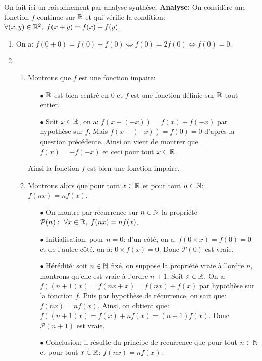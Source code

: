 \documentclass[a4paper, 11pt,reqno]{article}
\begin{document}
\begin{correction}  \; On fait ici un raisonnement par analyse-synth\`{e}se. \textbf{Analyse:} On consid\`{e}re une fonction $f$ continue sur $\mathbb{R}$ et qui v\'erifie la condition: $\forall (x,y)\in\R^2,\ f(x+y)=f(x)+f(y)$.
	\begin{enumerate}
		\item On a: $f(0+0)=f(0)+f(0)\Leftrightarrow f(0)=2f(0)\Leftrightarrow f(0)=0$.
		\item
		      \begin{enumerate}
			      \item Montrons que $f$ est une fonction impaire:
			            \begin{itemize}
				            \item[$\bullet$] $\mathbb{R}$ est bien centr\'e en 0 et $f$ est une fonction d\'efinie sur $\mathbb{R}$ tout entier.
				            \item[$\bullet$] Soit $x\in\mathbb{R}$, on a: $f(x+(-x))=f(x)+f(-x)$ par hypoth\`{e}se sur $f$. Mais $f(x+(-x))=f(0)=0$ d'apr\`{e}s la question pr\'ec\'edente. Ainsi on vient de montrer que $f(x)=-f(-x)$ et ceci pour tout $x\in\mathbb{R}$.
			            \end{itemize}
			            Ainsi la fonction $f$ est bien une fonction impaire.
			      \item Montrons alors que pour tout $x\in\mathbb{R}$ et pour tout $n\in\mathbb{N}$: $f(nx)=nf(x)$.
			            \begin{itemize}
				            \item[$\bullet$] On montre par r\'ecurrence sur $n\in\mathbb{N}$ la propri\'et\'e $\mathcal{P}(n):\ \forall x\in\mathbb{R},\ f(nx)=nf(x)$.
				            \item[$\bullet$] Initialisation: pour $n=0$: d'un c\^{o}t\'e, on a: $f(0\times x)=f(0)=0$ et de l'autre c\^{o}t\'e, on a: $0\times f(x)=0$. Donc $\mathcal{P}(0)$ est vraie.
				            \item[$\bullet$] H\'er\'edit\'e: soit $n\in\mathbb{N}$ fix\'e, on suppose la propri\'et\'e vraie \`{a} l'ordre $n$, montrons qu'elle est vraie \`{a} l'ordre $n+1$. Soit $x\in\mathbb{R}$. On a: $f((n+1)x)=f(nx+x)=f(nx)+f(x)$ par hypoth\`{e}se sur la fonction $f$. Puis par hypoth\`{e}se de r\'ecurrence, on sait que: $f(nx)=nf(x)$. Ainsi, on obtient que: $f((n+1)x)=f(x)+nf(x)=(n+1)f(x)$. Donc $\mathcal{P}(n+1)$ est vraie.
				            \item[$\bullet$] Conclusion: il r\'esulte du principe de r\'ecurrence que pour tout $n\in\mathbb{N}$ et pour tout $x\in\mathbb{R}$: $f(nx)=nf(x)$.
			            \end{itemize}

\end{enumerate}
\end{enumerate}
\end{correction}
\end{document}
